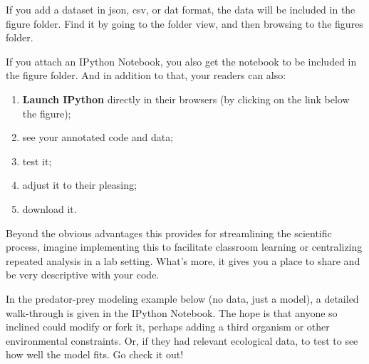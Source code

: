 If you add a dataset in json, csv, or dat format, the data will be included in the figure folder. Find it by going to the folder view, and then browsing to the figures folder.

If you attach an IPython Notebook, you also get the notebook to be included in the figure folder. And in addition to that, your readers can also: 
\begin{enumerate}
\item \textbf{Launch IPython} directly in their browsers (by clicking on the link below the figure);
\item see your annotated code and data;
\item test it;
\item adjust it to their pleasing;
\item download it.
\end{enumerate}
Beyond the obvious advantages this provides for streamlining the scientific process, imagine implementing this to facilitate classroom learning or centralizing repeated analysis in a lab setting.  What's more, it gives you a place to share and be very descriptive with your code.  

In the predator-prey modeling example below (no data, just a model), a detailed walk-through is given in the IPython Notebook. The hope is that anyone so inclined could modify or fork it, perhaps adding a third organism or other environmental constraints.  Or, if they had relevant ecological data, to test to see how well the model fits. Go check it out!
